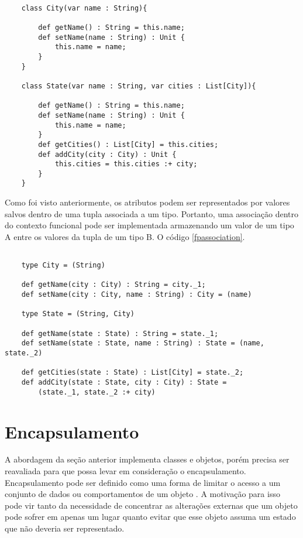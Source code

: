 \begin{lstlisting}[caption={Exemplo de associação entre classes},label=ooassociation]
    
    class City(var name : String){

        def getName() : String = this.name;
        def setName(name : String) : Unit {
            this.name = name;
        }
    }

    class State(var name : String, var cities : List[City]){

        def getName() : String = this.name;
        def setName(name : String) : Unit {
            this.name = name;
        }
        def getCities() : List[City] = this.cities;
        def addCity(city : City) : Unit {
            this.cities = this.cities :+ city;
        }
    }

\end{lstlisting}

Como foi visto anteriormente, os atributos 
podem ser representados por valores salvos 
dentro de uma tupla associada a um tipo. 
Portanto, uma associação dentro do contexto 
funcional pode ser implementada armazenando 
um valor de um tipo A entre os valores da tupla 
de um tipo B. O código \ref{fpassociation}.

\begin{lstlisting}[caption={Exemplo de associação no contexto funcional},label=fpassociation]
    
    type City = (String)
    
    def getName(city : City) : String = city._1;
    def setName(city : City, name : String) : City = (name)

    type State = (String, City)
    
    def getName(state : State) : String = state._1;
    def setName(state : State, name : String) : State = (name, state._2)
    
    def getCities(state : State) : List[City] = state._2;
    def addCity(state : State, city : City) : State =
        (state._1, state._2 :+ city)

\end{lstlisting}

\section{Encapsulamento}

A abordagem da seção anterior implementa 
classes e objetos, porém precisa ser 
reavaliada para que possa levar em consideração 
o encapsulamento. Encapsulamento pode ser definido 
como uma forma de limitar o acesso a um conjunto 
de dados ou comportamentos de um objeto \cite{quarkoo}. 
A motivação para isso pode vir tanto da necessidade 
de concentrar as alterações externas que um objeto 
pode sofrer em apenas um lugar quanto evitar que 
esse objeto assuma um estado que não deveria ser 
representado. 

